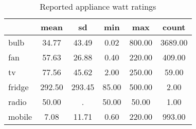 \begin{table}[htbp]\centering
\caption{Reported appliance watt ratings\label {tab1}}
\begin{tabular}{l*{5}{c}}
\toprule
            &        mean&          sd&         min&         max&       count\\
\midrule
bulb        &       34.77&       43.49&        0.02&      800.00&     3689.00\\
fan         &       57.63&       26.88&        0.40&      220.00&      409.00\\
tv          &       77.56&       45.62&        2.00&      250.00&       59.00\\
fridge      &      292.50&      293.45&       85.00&      500.00&        2.00\\
radio       &       50.00&           .&       50.00&       50.00&        1.00\\
mobile      &        7.08&       11.71&        0.60&      220.00&      993.00\\
\bottomrule
\end{tabular}
\end{table}
